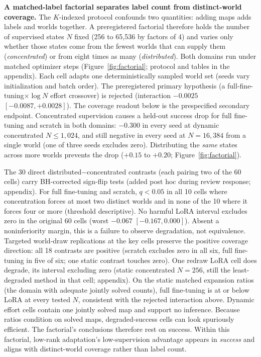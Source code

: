 \documentclass[letterpaper]{article} %
\begin{document}
\textbf{A matched-label factorial separates label count from distinct-world coverage.} The $K$-indexed protocol confounds two quantities: adding maps adds labels and worlds together. A preregistered factorial therefore holds the number of supervised states $N$ fixed (256 to 65{,}536 by factors of 4) and varies only whether those states come from the fewest worlds that can supply them (\emph{concentrated}) or from eight times as many (\emph{distributed}). Both domains run under matched optimizer steps (Figure~\ref{fig:factorial}; protocol and tables in the appendix). Each cell adapts one deterministically sampled world set (seeds vary initialization and batch order). The preregistered primary hypothesis (a full-fine-tuning$\times\log N$ effort crossover) is rejected (interaction $-0.0025$ $[-0.0087, +0.0028]$). The coverage readout below is the prespecified secondary endpoint. Concentrated supervision causes a held-out success drop for full fine-tuning and scratch in both domains: $-0.300$ in every seed at dynamic concentrated $N \leq 1{,}024$, and still negative in every seed at $N{=}16{,}384$ from a single world (one of three seeds excludes zero). Distributing the \emph{same} states across more worlds prevents the drop ($+0.15$ to $+0.20$; Figure~\ref{fig:factorial}).

The 30 direct distributed$-$concentrated contrasts (each pairing two of the 60 cells) carry BH-corrected sign-flip tests (added post hoc during review response; appendix). For full fine-tuning and scratch, $q{<}0.05$ in all 10 cells where concentration forces at most two distinct worlds and in none of the 10 where it forces four or more (threshold descriptive). No harmful LoRA interval excludes zero in the original 60 cells (worst $-0.067$ $[-0.167, 0.000]$). Absent a noninferiority margin, this is a failure to observe degradation, not equivalence. Targeted world-draw replications at the key cells preserve the positive coverage direction: all 18 contrasts are positive (scratch excludes zero in all six, full fine-tuning in five of six; one static contrast touches zero). One redraw LoRA cell does degrade, its interval excluding zero (static concentrated $N{=}256$, still the least-degraded method in that cell; appendix). On the static matched expansion ratios (the domain with adequate jointly solved counts), full fine-tuning is at or below LoRA at every tested $N$, consistent with the rejected interaction above. Dynamic effort cells contain one jointly solved map and support no inference. Because ratios condition on solved maps, degraded-success cells can look spuriously efficient. The factorial's conclusions therefore rest on success. Within this factorial, low-rank adaptation's low-supervision advantage appears in \emph{success} and aligns with distinct-world coverage rather than label count.
\end{document}
